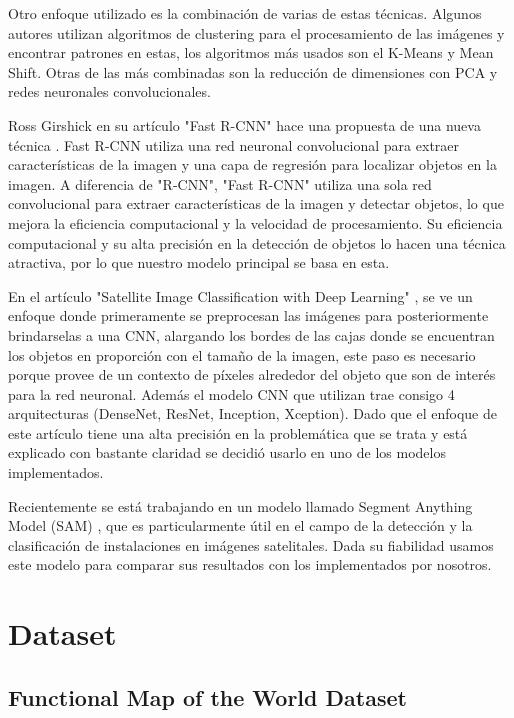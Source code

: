 \documentclass[article]{llncs}
\begin{document}
Otro enfoque utilizado es la combinación de varias de estas técnicas. Algunos autores utilizan algoritmos de clustering 
para el procesamiento de las imágenes y encontrar patrones en estas, los algoritmos más usados son el K-Means y Mean Shift. Otras de las más combinadas 
son la reducción de dimensiones con PCA y redes neuronales convolucionales.

Ross Girshick en su artículo "Fast R-CNN" hace una propuesta de una nueva técnica \cite{FRCNN}. Fast R-CNN utiliza una red neuronal 
convolucional para extraer características de la imagen y una capa de regresión para localizar objetos en la imagen. 
A diferencia de "R-CNN", "Fast R-CNN" utiliza una sola red convolucional para extraer características de la imagen y 
detectar objetos, lo que mejora la eficiencia computacional y la velocidad de procesamiento. Su eficiencia computacional y su alta precisión en la detección de objetos 
lo hacen una técnica atractiva, por lo que nuestro modelo principal se basa en esta. 

En el artículo "Satellite Image Classification with Deep Learning" \cite{satelite}, se ve un enfoque donde primeramente se 
preprocesan las imágenes para posteriormente brindarselas a una CNN, alargando los bordes de las cajas donde se encuentran los objetos en proporción con el tamaño de 
la imagen, este paso es necesario porque provee de un contexto de píxeles alrededor del objeto que son de interés para la red 
neuronal. Además el modelo CNN que utilizan trae consigo 4 arquitecturas (DenseNet, ResNet, Inception, Xception). 
Dado que el enfoque de este artículo tiene una alta precisión en la problemática que se trata y está explicado con bastante claridad 
se decidió usarlo en uno de los modelos implementados.

Recientemente se está trabajando en un modelo llamado Segment Anything Model (SAM) \cite{SAM}, que es particularmente útil 
en el campo de la detección y la clasificación de instalaciones en imágenes satelitales. Dada su fiabilidad usamos 
este modelo para comparar sus resultados con los implementados por nosotros.


\section{Dataset}

\subsection{Functional Map of the World Dataset}
\end{document}
